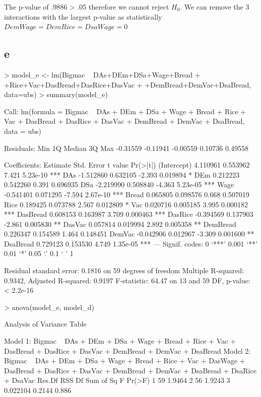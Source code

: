 \documentclass{article}
\begin{document}
The p-value of .9886 > .05 therefore we cannot reject $H_0$. We can remove the 3 interactions with the largest p-value as statistically $DemWage=DemRice=DsaWage=0$

\subsection*{e}
\begin{Schunk}
\begin{Sinput}
> model_e <- lm(Bigmac ~ DAs+DEm+DSa+Wage+Bread
+               +Rice+Vac+DasBread+DasRice+DasVac
+               +DemBread+DemVac+DsaBread, data=ubs)
> summary(model_e)
\end{Sinput}
\begin{Soutput}
Call:
lm(formula = Bigmac ~ DAs + DEm + DSa + Wage + Bread + Rice + 
    Vac + DasBread + DasRice + DasVac + DemBread + DemVac + DsaBread, 
    data = ubs)

Residuals:
     Min       1Q   Median       3Q      Max 
-0.31559 -0.11941 -0.00559  0.10736  0.49558 

Coefficients:
             Estimate Std. Error t value Pr(>|t|)    
(Intercept)  4.110961   0.553962   7.421 5.23e-10 ***
DAs         -1.512860   0.632105  -2.393 0.019894 *  
DEm          0.212223   0.542260   0.391 0.696935    
DSa         -2.219990   0.508840  -4.363 5.23e-05 ***
Wage        -0.541401   0.071295  -7.594 2.67e-10 ***
Bread        0.065805   0.098576   0.668 0.507019    
Rice         0.189425   0.073788   2.567 0.012809 *  
Vac          0.020716   0.005185   3.995 0.000182 ***
DasBread     0.608153   0.163987   3.709 0.000463 ***
DasRice     -0.394569   0.137903  -2.861 0.005830 ** 
DasVac       0.057814   0.019994   2.892 0.005358 ** 
DemBread     0.226347   0.154589   1.464 0.148451    
DemVac      -0.042906   0.012967  -3.309 0.001600 ** 
DsaBread     0.729123   0.153530   4.749 1.35e-05 ***
---
Signif. codes:  0 ‘***’ 0.001 ‘**’ 0.01 ‘*’ 0.05 ‘.’ 0.1 ‘ ’ 1

Residual standard error: 0.1816 on 59 degrees of freedom
Multiple R-squared:  0.9342,	Adjusted R-squared:  0.9197 
F-statistic: 64.47 on 13 and 59 DF,  p-value: < 2.2e-16
\end{Soutput}
\begin{Sinput}
> anova(model_e, model_d)
\end{Sinput}
\begin{Soutput}
Analysis of Variance Table

Model 1: Bigmac ~ DAs + DEm + DSa + Wage + Bread + Rice + Vac + DasBread + 
    DasRice + DasVac + DemBread + DemVac + DsaBread
Model 2: Bigmac ~ DAs + DEm + DSa + Wage + Bread + Rice + Vac + DasWage + 
    DasBread + DasRice + DasVac + DemBread + DemVac + DsaBread + 
    DsaRice + DsaVac
  Res.Df    RSS Df Sum of Sq      F Pr(>F)
1     59 1.9464                           
2     56 1.9243  3  0.022104 0.2144  0.886
\end{Soutput}
\end{Schunk}
\end{document}
